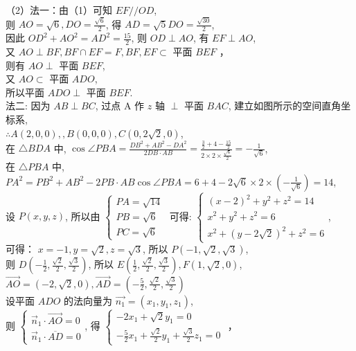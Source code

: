 \documentclass[a4paper,11pt,UTF8]{article}
\begin{document}
（2）法一：由（1）可知 $E F / / O D$, \\则 $A O=\sqrt{6}, D O=\frac{\sqrt{6}}{2}$, 得 $A D=\sqrt{5} D O=\frac{\sqrt{30}}{2}$,\\ 因此 $O D^2+A O^2=A D^2=\frac{15}{2}$, 则 $O D \perp A O$, 有 $E F \perp A O$,\\ 又 $A O \perp B F, B F \cap E F=F, B F, E F \subset$ 平面 $B E F$ ，\\
则有 $A O \perp$ 平面 $B E F$, \\又 $A O \subset$ 平面 $A D O$, \\所以平面 $A D O \perp$ 平面 $B E F$.\\
法二: 因为 $A B \perp B C$, 过点 $\mathrm{A}$ 作 $z$ 轴 $\perp$ 平面 $B A C$, 建立如图所示的空间直角坐标系,\\ $\therefore A(2,0,0),, B(0,0,0), C(0,2 \sqrt{2}, 0)$,\\
在 $\displaystyle\triangle B D A$ 中, $\displaystyle\cos \angle P B A=\frac{D B^2+A B^2-D A^2}{2 D B \cdot A B}=\frac{\frac{3}{2}+4-\frac{15}{2}}{2 \times 2 \times \frac{\sqrt{6}}{2}}=-\frac{1}{\sqrt{6}}$,\\
在 $\triangle P B A$ 中, $P A^2=P B^2+A B^2-2 P B \cdot A B \cos \angle P B A=6+4-2 \sqrt{6} \times 2 \times\left(-\frac{1}{\sqrt{6}}\right)=14$,\\
设 $P(x, y, z)$, 所以由 $\left\{\begin{array}{l}P A=\sqrt{14} \\ P B=\sqrt{6} \\ P C=\sqrt{6}\end{array}\right.$ 可得: $\left\{\begin{array}{l}(x-2)^2+y^2+z^2=14 \\ x^2+y^2+z^2=6 \\ x^2+(y-2 \sqrt{2})^2+z^2=6\end{array}\right.$,\\
可得： $x=-1, y=\sqrt{2}, z=\sqrt{3}$, 所以 $P(-1, \sqrt{2}, \sqrt{3})$,\\
则 $\displaystyle D\left(-\frac{1}{2}, \frac{\sqrt{2}}{2}, \frac{\sqrt{3}}{2}\right)$, 所以 $\displaystyle E\left(\frac{1}{2}, \frac{\sqrt{2}}{2}, \frac{\sqrt{3}}{2}\right), F(1, \sqrt{2}, 0)$,
$\displaystyle\overrightarrow{A O}=(-2, \sqrt{2}, 0), \overrightarrow{A D}=\left(-\frac{5}{2}, \frac{\sqrt{2}}{2}, \frac{\sqrt{3}}{2}\right)$\\
设平面 $A D O$ 的法向量为 $\overrightarrow{n_1}=\left(x_1, y_1, z_1\right)$,\\
则 $\left\{\begin{array}{l}\vec{n}_1 \cdot \overrightarrow{A O}=0 \\ \vec{n}_1 \cdot \overline{A D}=0\end{array}\right.$, 得 $\left\{\begin{array}{l}\displaystyle-2 x_1+\sqrt{2} y_1=0 \\ \displaystyle-\frac{5}{2} x_1+\frac{\sqrt{2}}{2} y_1+\frac{\sqrt{3}}{2} z_1=0\end{array}\right.$ ，\\
\end{document}
